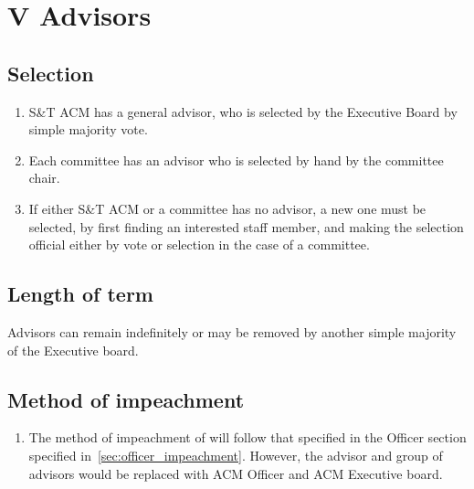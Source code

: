
\section{V \textendash{} Advisors}
\subsection{Selection}
\begin{enumerate}
  \item S\&T ACM has a general advisor, who is selected by the Executive Board
  by simple majority vote.
  \item Each committee has an advisor who is selected by hand by the committee
  chair.
  \item If either S\&T ACM or a committee has no advisor, a new one must be
  selected, by first finding an interested staff member, and making the
  selection official either by vote or selection in the case of a committee.
\end{enumerate}
\subsection{Length of term}
  Advisors can remain indefinitely or may be removed by another simple majority
  of the Executive board.
\subsection{Method of impeachment}
    \begin{enumerate}[label=\arabic*.]
      \item The method of impeachment of will follow that specified in the
        Officer section specified in~\ref{sec:officer_impeachment}. However, the
        advisor and group of advisors would be replaced with ACM Officer and ACM
        Executive board.
    \end{enumerate}
